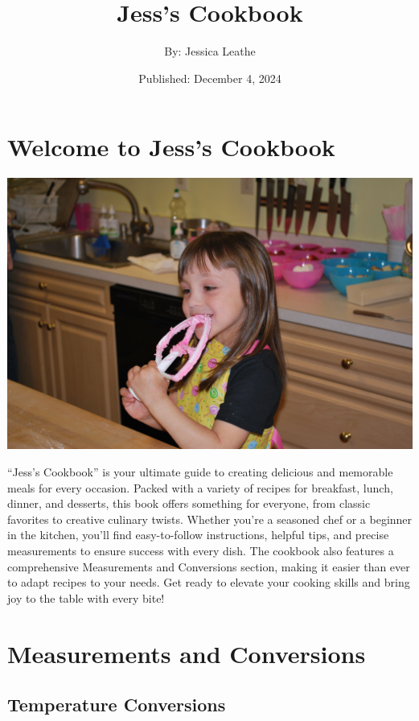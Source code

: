 \documentclass[
]{book}
\title{Jess's Cookbook}
\author{By: Jessica Leathe}
\date{Published: December 4, 2024}
\begin{document}
\frontmatter
\maketitle

\mainmatter
\chapter*{Welcome to Jess's Cookbook}\label{welcome-to-jesss-cookbook}

\includegraphics{DSC_0165.jpg}

``Jess's Cookbook'' is your ultimate guide to creating delicious and
memorable meals for every occasion. Packed with a variety of recipes for
breakfast, lunch, dinner, and desserts, this book offers something for
everyone, from classic favorites to creative culinary twists. Whether
you're a seasoned chef or a beginner in the kitchen, you'll find
easy-to-follow instructions, helpful tips, and precise measurements to
ensure success with every dish. The cookbook also features a
comprehensive Measurements and Conversions section, making it easier
than ever to adapt recipes to your needs. Get ready to elevate your
cooking skills and bring joy to the table with every bite!

\chapter*{Measurements and
Conversions}\label{measurements-and-conversions}

\section*{Temperature Conversions}\label{temperature-conversions}
\end{document}
